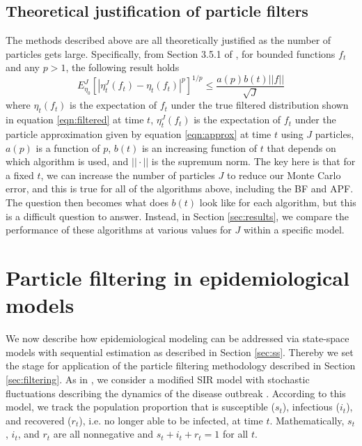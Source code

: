 \documentclass{elsarticle}
\begin{document}
\subsection{Theoretical justification of particle filters}

The methods described above are all theoretically justified as the number of particles gets large. Specifically, from Section 3.5.1 of \cite{del2004feynman}, for bounded functions $f_t$ and any $p>1$, the following result holds
\[ E_{\eta_0}^J \left[ \left| \eta_t^J(f_t)-\eta_t(f_t)\right|^p\right]^{1/p} \le \frac{a(p) b(t) ||f||}{\sqrt{J}} \]
where $\eta_t(f_t)$ is the expectation of $f_t$ under the true filtered distribution shown in equation \eqref{eqn:filtered} at time $t$, $\eta_t^J(f_t)$ is the expectation of $f_t$ under the particle approximation given by equation \eqref{eqn:approx} at time $t$ using $J$ particles, $a(p)$ is a function of $p$, $b(t)$ is an increasing function of $t$ that depends on which algorithm is used, and $||\cdot||$ is the supremum norm. The key here is that for a fixed $t$, we can increase the number of particles $J$ to reduce our Monte Carlo error, and this is true for all of the algorithms above, including the BF and APF. The question then becomes what does $b(t)$ look like for each algorithm, but this is a difficult question to answer. Instead, in Section \ref{sec:results}, we compare the performance of these algorithms at various values for $J$ within a specific model.

\section{Particle filtering in epidemiological models \label{sec:apply}}

We now describe how epidemiological modeling can be addressed via state-space models with sequential estimation as described in Section \ref{sec:ss}. Thereby we set the stage for application of the particle filtering methodology described in Section \ref{sec:filtering}. As in \citet{skvortsov2012monitoring}, we consider a modified SIR model with stochastic fluctuations describing the dynamics of the disease outbreak \citep{herwaarden1995stochepid, dangerfield2009stochepid, anderson2004sars}. According to this model, we track the population proportion that is susceptible ($s_t$), infectious ($i_t$), and recovered ($r_t$), i.e. no longer able to be infected, at time $t$. Mathematically, $s_t$, $i_t$, and $r_t$ are all nonnegative and $s_t + i_t + r_t = 1$ for all $t$.
\end{document}
